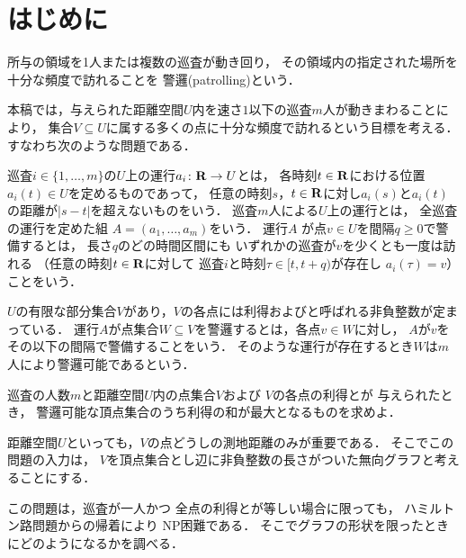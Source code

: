 
\section{はじめに}
所与の領域を1人または複数の巡査が動き回り，
その領域内の指定された場所を十分な頻度で訪れることを
警邏(patrolling)という\cite{chen2013fence, coene2011charlemagne, czyzowicz2011boundary}．


本稿では，与えられた距離空間$U$内を速さ$1$以下の巡査$m$人が動きまわることにより，
集合$V \subseteq U$に属する多くの点に十分な頻度で訪れるという目標を考える．
すなわち次のような問題である．

巡査$i \in \{1, \ldots, m\}$の$U$上の運行$a _i \colon \mathbf R \to U$とは，
各時刻$t \in \mathbf R$における位置$a _i (t) \in U$を定めるものであって，
任意の時刻$s$，$t \in \mathbf R$に対し$a _i (s)$と$a _i (t)$の距離が$\lvert s - t \rvert$を超えないものをいう．
巡査$m$人による$U$上の運行とは，
全巡査の運行を定めた組
$A = (a _1, \dots, a _m)$をいう．
運行$A$%
が点$v \in U$を間隔$q \geq 0$で警備するとは，
長さ$q$のどの時間区間にも
いずれかの巡査が$v$を少くとも一度は訪れる
（任意の時刻$t \in \mathbf R$に対して
巡査$i$と時刻$\tau \in [t, t + q)$が存在し
$a _i (\tau) = v$）ことをいう．

$U$の有限な部分集合$V$があり，$V$の各点には利得および{\idletime}と呼ばれる非負整数が定まっている．
運行$A$が点集合$W \subseteq V$を警邏するとは，各点$v \in W$に対し，
$A$が$v$をその{\idletime}以下の間隔で警備することをいう．
そのような運行が存在するとき$W$は$m$人により警邏可能であるという．

\begin{cooperativepatrollingproblem}
    巡査の人数$m$と距離空間$U$内の点集合$V$および
    $V$の各点の利得と{\idletime}が
    与えられたとき，
    警邏可能な頂点集合のうち利得の和が最大となるものを求めよ．
\end{cooperativepatrollingproblem}

距離空間$U$といっても，$V$の点どうしの測地距離のみが重要である．
そこでこの問題の入力は，
$V$を頂点集合とし辺に非負整数の長さがついた無向グラフと考えることにする．

この問題は，巡査が一人かつ
全点の利得と{\idletime}が等しい場合に限っても，
ハミルトン路問題からの帰着により
NP困難である\cite[Theorem~8]{coene2011charlemagne}．
そこでグラフの形状を限ったときにどのようになるかを調べる．

